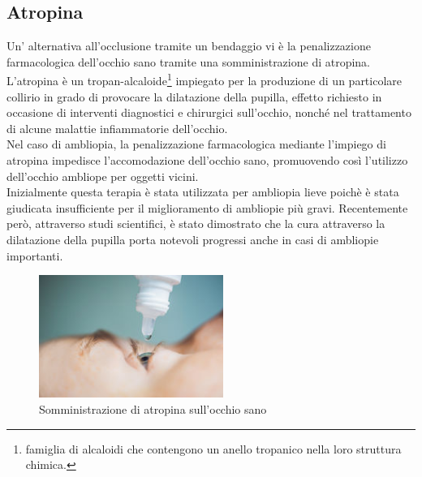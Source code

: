 \documentclass[12pt,a4paper,openright,twoside]{book}
\begin{document}
    \subsection{Atropina}
    Un' alternativa all'occlusione tramite un bendaggio vi è la penalizzazione farmacologica dell'occhio sano tramite una somministrazione di atropina.\\
    L'atropina è un tropan-alcaloide\footnote{famiglia di alcaloidi che contengono un anello tropanico nella loro struttura chimica.} impiegato per la produzione di un particolare collirio in grado di provocare la dilatazione della pupilla, effetto richiesto in occasione di interventi diagnostici e chirurgici sull'occhio, nonché nel trattamento di alcune malattie infiammatorie dell'occhio.\\
    Nel caso di ambliopia, la penalizzazione farmacologica mediante l'impiego di atropina impedisce l’accomodazione dell’occhio sano, promuovendo così l'utilizzo dell'occhio ambliope per oggetti vicini.\\
    Inizialmente questa terapia è stata utilizzata per ambliopia lieve poichè è stata giudicata insufficiente per il miglioramento di ambliopie più gravi. Recentemente però, attraverso studi scientifici, è stato dimostrato che la cura attraverso la dilatazione della pupilla porta notevoli progressi anche in casi di ambliopie importanti.
    \begin{figure}[h]
    	\centering   	
    	\includegraphics[width=60mm]{atrop.jpg}
    	\caption{Somministrazione di atropina sull'occhio sano}
    	\label{fig:atrop}
    \end{figure}
\end{document}
